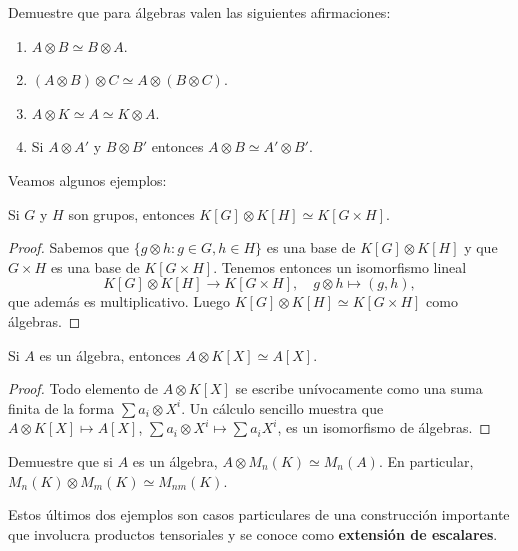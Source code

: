 \begin{exercise}
	Demuestre que para álgebras valen las siguientes afirmaciones:
	\begin{enumerate}
		\item $A\otimes B\simeq B\otimes A$.
		\item $(A\otimes B)\otimes C\simeq A\otimes(B\otimes C)$.
		\item $A\otimes K\simeq A\simeq K\otimes A$.
		\item Si $A\otimes A'$ y $B\otimes B'$ entonces $A\otimes B\simeq A'\otimes B'$.
	\end{enumerate}
\end{exercise}

Veamos algunos ejemplos:

\begin{proposition}
	Si $G$ y $H$ son grupos, entonces $K[G]\otimes K[H]\simeq K[G\times H]$.
\end{proposition}

\begin{proof}
	Sabemos que $\{g\otimes h:g\in G,h\in H\}$ es una base de $K[G]\otimes K[H]$ y que
	$G\times H$ es una base de $K[G\times H]$. Tenemos entonces un isomorfismo lineal 
	\[
	K[G]\otimes K[H]\to K[G\times H], 
	\quad 
	g\otimes h\mapsto (g,h),
	\]
	que además es multiplicativo. Luego $K[G]\otimes K[H]\simeq K[G\times H]$
	como álgebras.
\end{proof}

\begin{proposition}
	Si $A$ es un álgebra, entonces $A\otimes K[X]\simeq A[X]$.	
\end{proposition}

\begin{proof}
	Todo elemento de $A\otimes K[X]$ se escribe unívocamente como una suma
	finita de la forma $\sum a_i\otimes X^i$. Un cálculo sencillo muestra que
	$A\otimes K[X]\mapsto A[X]$, $\sum a_i\otimes X^i\mapsto \sum a_iX^i$, es
	un isomorfismo de álgebras.
\end{proof}

\begin{exercise}
	Demuestre que si $A$ es un álgebra, $A\otimes M_n(K)\simeq M_n(A)$. En
	particular, $M_n(K)\otimes M_m(K)\simeq M_{nm}(K)$.
\end{exercise}

Estos últimos dos ejemplos son casos particulares de una construcción
importante que involucra productos tensoriales y se conoce como
\textbf{extensión de escalares}.

